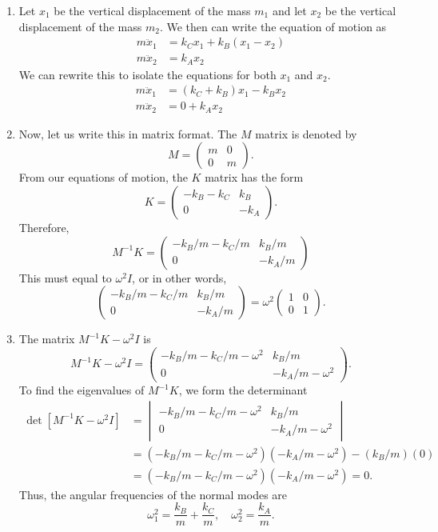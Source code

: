 \begin{sol}
\begin{enumerate}[label=\textbf{(\alph*)}] 
\item Let $x_1$ be the vertical displacement of the mass $m_1$ and let $x_2$ be the vertical displacement of the mass $m_2$. We then can write the equation of motion as 
\begin{align*}
    m\ddot{x}_1 &= k_C x_1 + k_B (x_1 - x_2) \\
    m\ddot{x}_2 &= k_A x_2 
\end{align*}
We can rewrite this to isolate the equations for both $x_1$ and $x_2$. 
\begin{align*}
    m\ddot{x}_1 &= (k_C + k_B) x_1 - k_B x_2 \\
    m\ddot{x}_2 &= 0 + k_A x_2 
\end{align*}

\item Now, let us write this in matrix format. The $M$ matrix is denoted by 
\[
M = 
\begin{pmatrix}
m & 0 \\
0 & m
\end{pmatrix}.
\]
From our equations of motion, the $K$ matrix has the form 
\[
K = 
\begin{pmatrix}
-k_B - k_C & k_B \\
0 & -k_A
\end{pmatrix}.
\]
Therefore, 
\[M^{-1}K = \begin{pmatrix}
-k_B/m - k_C/m & k_B/m \\
0 & -k_A/m
\end{pmatrix}
\]
This must equal to $\omega^2 I$, or in other words,
\[
\begin{pmatrix}
-k_B/m - k_C/m & k_B/m \\
0 & -k_A/m
\end{pmatrix} = \omega^2\begin{pmatrix}
1 & 0 \\
0 & 1
\end{pmatrix}.
\]
\item The matrix $M^{-1}K - \omega^2 I$ is 
\[M^{-1}K - \omega^2 I = 
\begin{pmatrix}
-k_B/m - k_C/m - \omega^2 & k_B/m \\
0 & -k_A/m - \omega^2
\end{pmatrix}.
\]
To find the eigenvalues of $M^{−1}K$, we form the determinant 
\begin{align*}
\det [M^{-1}K - \omega^2 I] &= 
\begin{vmatrix}
-k_B/m - k_C/m - \omega^2 & k_B/m \\
0 & -k_A/m - \omega^2
\end{vmatrix} \\
&= (-k_B/m - k_C/m - \omega^2)(-k_A/m - \omega^2) - (k_B/m)(0) \\
&= (-k_B/m - k_C/m - \omega^2)(-k_A/m - \omega^2) = 0.
\end{align*}
Thus, the angular frequencies of the normal modes are 
\[\omega_1^2 = \frac{k_B}{m} + \frac{k_C}{m}, \quad \omega_2^2 = \frac{k_A}{m}.\]
\end{enumerate}
\end{sol}